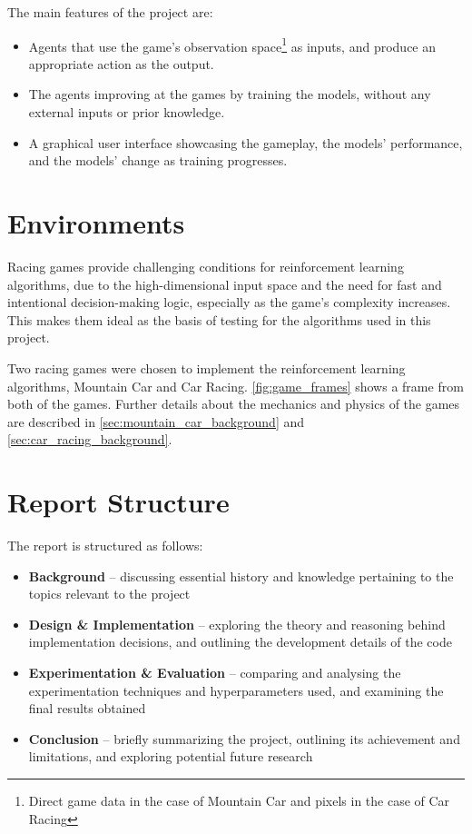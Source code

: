 \newpage

The main features of the project are:

\begin{itemize}
  \item Agents that use the game's observation space\footnote{Direct game data in the
          case of Mountain Car and pixels in the case of Car Racing} as inputs, and
        produce an appropriate action as the output.
  \item The agents improving at the games by training the models, without any external
        inputs or prior knowledge.
  \item A graphical user interface showcasing the gameplay, the models' performance,
        and the models' change as training progresses.
\end{itemize}

\section{Environments}

Racing games provide challenging conditions for reinforcement learning
algorithms, due to the high-dimensional input space and the need for fast and
intentional decision-making logic, especially as the game's complexity
increases. This makes them ideal as the basis of testing for the algorithms
used in this project.

Two racing games were chosen to implement the reinforcement learning
algorithms, Mountain Car and Car Racing. \autoref{fig:game_frames} shows a
frame from both of the games. Further details about the mechanics and physics
of the games are described in \autoref{sec:mountain_car_background} and
\autoref{sec:car_racing_background}.



\newpage

\section{Report Structure}
The report is structured as follows:

\begin{itemize}
  \item \textbf{Background} -- discussing essential history and knowledge pertaining to the topics relevant to the project
  \item \textbf{Design \& Implementation} -- exploring the theory and reasoning behind implementation decisions, and outlining the development details of the code
  \item \textbf{Experimentation \& Evaluation} -- comparing and analysing the experimentation techniques and hyperparameters used, and examining the final results obtained
  \item \textbf{Conclusion} -- briefly summarizing the project, outlining its achievement and limitations, and exploring potential future research
\end{itemize}
